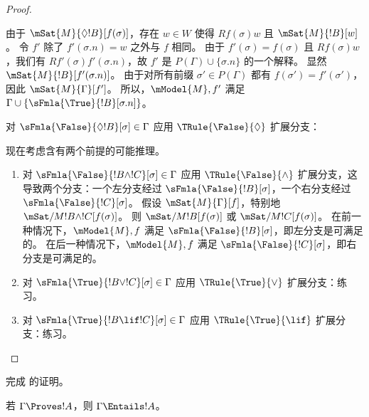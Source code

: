 \documentclass[../../../include/open-logic-section]{subfiles}
\begin{document}
\begin{proof}
\begin{enumerate}
{{    由于 $\mSat{M}{\Diamond !B}[f(\sigma)]$，存在 $w \in W$ 使得 $Rf(\sigma)w$ 且 $\mSat{M}{!B}[w]$。
    令 $f'$ 除了 $f'(\sigma.n) = w$ 之外与 $f$ 相同。
    由于 $f'(\sigma) = f(\sigma)$ 且 $Rf(\sigma)w$，我们有 $Rf'(\sigma)f'(\sigma.n)$，故 $f'$ 是 $P(\Gamma) \cup \{\sigma.n\}$ 的一个解释。
    显然 $\mSat{M}{!B}[f'(\sigma.n)]$。
    由于对所有前缀 $\sigma' \in P(\Gamma)$ 都有 $f(\sigma') = f'(\sigma')$，因此 $\mSat{M}{\Gamma}[f']$。
    所以，$\mModel{M}, f'$ 满足 $\Gamma \cup
  \{\sFmla{\True}{!B}[\sigma.n]\}$。}
\item 对 $\sFmla{\False}{\Diamond !B}[\sigma] \in \Gamma$ 应用 $\TRule{\False}{\Diamond}$ 扩展分支：
  }{}
\end{enumerate}
现在考虑含有两个前提的可能推理。
\begin{enumerate}
\item 对 $\sFmla{\False}{!B \land !C}[\sigma] \in \Gamma$ 应用 $\TRule{\False}{\land}$ 扩展分支，这导致两个分支：一个左分支经过
  $\sFmla{\False}{!B}[\sigma]$，一个右分支经过
  $\sFmla{\False}{!C}[\sigma]$。
  假设 $\mSat{M}{\Gamma}[f]$，特别地 $\mSat/{M}{!B \land !C}[f(\sigma)]$。
  则 $\mSat/{M}{!B}[f(\sigma)]$ 或 $\mSat/{M}{!C}[f(\sigma)]$。
  在前一种情况下，$\mModel{M}, f$ 满足 $\sFmla{\False}{!B}[\sigma]$，即左分支是可满足的。
  在后一种情况下，$\mModel{M}, f$ 满足 $\sFmla{\False}{!C}[\sigma]$，即右分支是可满足的。
\item 对 $\sFmla{\True}{!B \lor !C}[\sigma] \in \Gamma$ 应用 $\TRule{\True}{\lor}$ 扩展分支：练习。
\item 对 $\sFmla{\True}{!B \lif !C}[\sigma] \in \Gamma$ 应用 $\TRule{\True}{\lif}$ 扩展分支：练习。
\end{enumerate}
\end{proof}

\begin{prob}
完成  的证明。
\end{prob}

\begin{cor}
若 $\Gamma \Proves !A$，则 $\Gamma \Entails !A$。
\end{cor}
\end{document}
